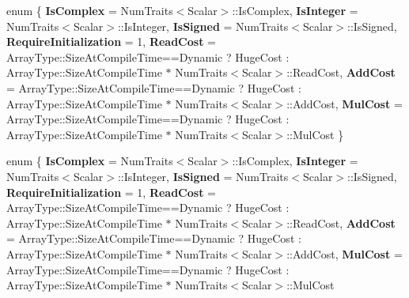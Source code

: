 \begin{DoxyCompactItemize}
\item 
\mbox{\label{struct_eigen_1_1_num_traits_3_01_array_3_01_scalar_00_01_rows_00_01_cols_00_01_options_00_01_max_rows_00_01_max_cols_01_4_01_4_a468ce26d0a2c4125fb0f6e527fe6bf0f}} 
enum \{ \newline
{\bfseries Is\+Complex} = Num\+Traits$<$Scalar$>$\+:\+:Is\+Complex, 
{\bfseries Is\+Integer} = Num\+Traits$<$Scalar$>$\+:\+:Is\+Integer, 
{\bfseries Is\+Signed} = Num\+Traits$<$Scalar$>$\+:\+:Is\+Signed, 
{\bfseries Require\+Initialization} = 1, 
\newline
{\bfseries Read\+Cost} = Array\+Type\+:\+:Size\+At\+Compile\+Time==Dynamic ? Huge\+Cost \+: Array\+Type\+:\+:Size\+At\+Compile\+Time $\ast$ Num\+Traits$<$Scalar$>$\+:\+:Read\+Cost, 
{\bfseries Add\+Cost} = Array\+Type\+:\+:Size\+At\+Compile\+Time==Dynamic ? Huge\+Cost \+: Array\+Type\+:\+:Size\+At\+Compile\+Time $\ast$ Num\+Traits$<$Scalar$>$\+:\+:Add\+Cost, 
{\bfseries Mul\+Cost} = Array\+Type\+:\+:Size\+At\+Compile\+Time==Dynamic ? Huge\+Cost \+: Array\+Type\+:\+:Size\+At\+Compile\+Time $\ast$ Num\+Traits$<$Scalar$>$\+:\+:Mul\+Cost
 \}
\item 
\mbox{\label{struct_eigen_1_1_num_traits_3_01_array_3_01_scalar_00_01_rows_00_01_cols_00_01_options_00_01_max_rows_00_01_max_cols_01_4_01_4_ad69ad1468d56988a99d9b3d4165db997}} 
enum \{ \newline
{\bfseries Is\+Complex} = Num\+Traits$<$Scalar$>$\+:\+:Is\+Complex, 
{\bfseries Is\+Integer} = Num\+Traits$<$Scalar$>$\+:\+:Is\+Integer, 
{\bfseries Is\+Signed} = Num\+Traits$<$Scalar$>$\+:\+:Is\+Signed, 
{\bfseries Require\+Initialization} = 1, 
\newline
{\bfseries Read\+Cost} = Array\+Type\+:\+:Size\+At\+Compile\+Time==Dynamic ? Huge\+Cost \+: Array\+Type\+:\+:Size\+At\+Compile\+Time $\ast$ Num\+Traits$<$Scalar$>$\+:\+:Read\+Cost, 
{\bfseries Add\+Cost} = Array\+Type\+:\+:Size\+At\+Compile\+Time==Dynamic ? Huge\+Cost \+: Array\+Type\+:\+:Size\+At\+Compile\+Time $\ast$ Num\+Traits$<$Scalar$>$\+:\+:Add\+Cost, 
{\bfseries Mul\+Cost} = Array\+Type\+:\+:Size\+At\+Compile\+Time==Dynamic ? Huge\+Cost \+: Array\+Type\+:\+:Size\+At\+Compile\+Time $\ast$ Num\+Traits$<$Scalar$>$\+:\+:Mul\+Cost

\end{DoxyCompactItemize}
